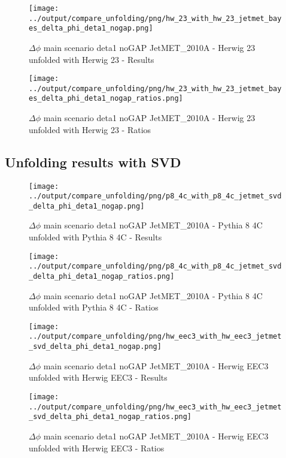 \documentclass[11pt]{book}
\begin{document}
\begin{figure}[ht]
\centering
\texttt{[image: ../output/compare\_unfolding/png/hw\_23\_with\_hw\_23\_jetmet\_bayes\_delta\_phi\_deta1\_nogap.png]}
\caption{$\Delta\phi$ main scenario deta1 noGAP JetMET\_2010A - Herwig 23 unfolded with Herwig 23 - Results}
\label{hw_23_hw_23_jetmet_bayes_delta_phi_deta1_nogap_a}
\end{figure}

\begin{figure}[ht]
\centering
\texttt{[image: ../output/compare\_unfolding/png/hw\_23\_with\_hw\_23\_jetmet\_bayes\_delta\_phi\_deta1\_nogap\_ratios.png]}
\caption{$\Delta\phi$ main scenario deta1 noGAP JetMET\_2010A - Herwig 23 unfolded with Herwig 23 - Ratios}
\label{hw_23_hw_23_jetmet_bayes_delta_phi_deta1_nogap_b}
\end{figure}


\clearpage
\subsection{Unfolding results with SVD}

\begin{figure}[ht]
\centering
\texttt{[image: ../output/compare\_unfolding/png/p8\_4c\_with\_p8\_4c\_jetmet\_svd\_delta\_phi\_deta1\_nogap.png]}
\caption{$\Delta\phi$ main scenario deta1 noGAP JetMET\_2010A - Pythia 8 4C unfolded with Pythia 8 4C - Results}
\label{p8_p8_jetmet_svd_delta_phi_deta1_nogap_a}
\end{figure}

\begin{figure}[ht]
\centering
\texttt{[image: ../output/compare\_unfolding/png/p8\_4c\_with\_p8\_4c\_jetmet\_svd\_delta\_phi\_deta1\_nogap\_ratios.png]}
\caption{$\Delta\phi$ main scenario deta1 noGAP JetMET\_2010A - Pythia 8 4C unfolded with Pythia 8 4C - Ratios}
\label{p8_p8_jetmet_svd_delta_phi_deta1_nogap_b}
\end{figure}

\begin{figure}[ht]
\centering
\texttt{[image: ../output/compare\_unfolding/png/hw\_eec3\_with\_hw\_eec3\_jetmet\_svd\_delta\_phi\_deta1\_nogap.png]}
\caption{$\Delta\phi$ main scenario deta1 noGAP JetMET\_2010A - Herwig EEC3 unfolded with Herwig EEC3 - Results}
\label{hw_eec3_hw_eec3_jetmet_svd_delta_phi_deta1_nogap_a}
\end{figure}

\begin{figure}[ht]
\centering
\texttt{[image: ../output/compare\_unfolding/png/hw\_eec3\_with\_hw\_eec3\_jetmet\_svd\_delta\_phi\_deta1\_nogap\_ratios.png]}
\caption{$\Delta\phi$ main scenario deta1 noGAP JetMET\_2010A - Herwig EEC3 unfolded with Herwig EEC3 - Ratios}
\label{hw_eec3_hw_eec3_jetmet_svd_delta_phi_deta1_nogap_b}
\end{figure}
\end{document}

